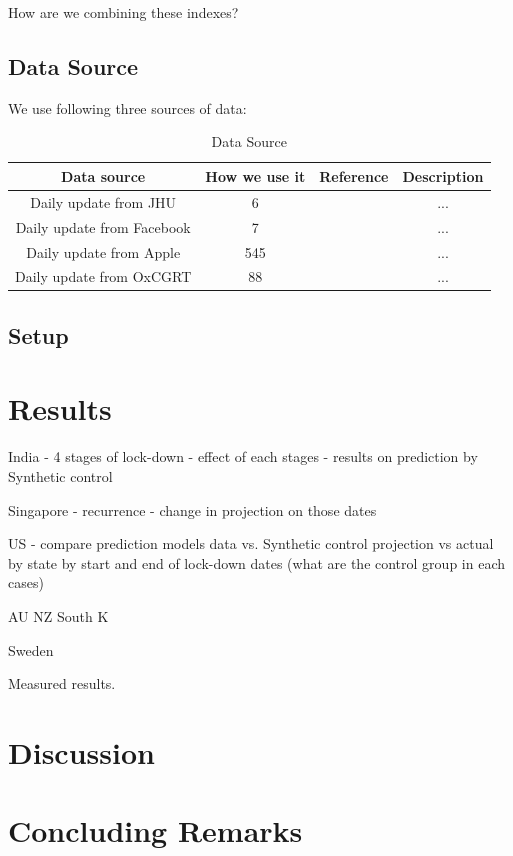 \documentclass[preprint,authoryear,12pt]{elsarticle}
\begin{document}
    How are we combining these indexes?

	\subsection{Data Source}
	We use following three sources of data:
	\begin{table}[h!]
		\centering
		\begin{tabular}{||c c c c||} 
			\hline
			Data source & How we use it & Reference & Description\\ [0.5ex] 
			\hline\hline
			Daily update from JHU & 6 & \cite{DDG2020} & ... \\ 
			Daily update from Facebook & 7 & \cite{JM2020} & ... \\
			Daily update from Apple & 545 & \cite{Apple2020} & ...\\
			Daily update from OxCGRT & 88 & \cite{HWP2020} & ...\\ [1ex] 
			\hline
		\end{tabular}
		\caption{Data Source}
		\label{Table1}
	\end{table}
	 
	 
	 
	\subsection{Setup}


\section{Results}
\label{SEC3}
	
	India - 4 stages of lock-down - effect of each stages - results on prediction by Synthetic control


	Singapore - recurrence - change in projection on those dates
	
	US - compare prediction models data vs. Synthetic control projection vs actual by state by start and end of lock-down dates (what are the control group in each cases)
	
	AU NZ South K
	
	Sweden
	
	Measured results. 
	
	\section{Discussion}
	\label{SEC4}
	
	
	\section{Concluding Remarks}
	\label{SEC5}
	
	
		
\end{document}
